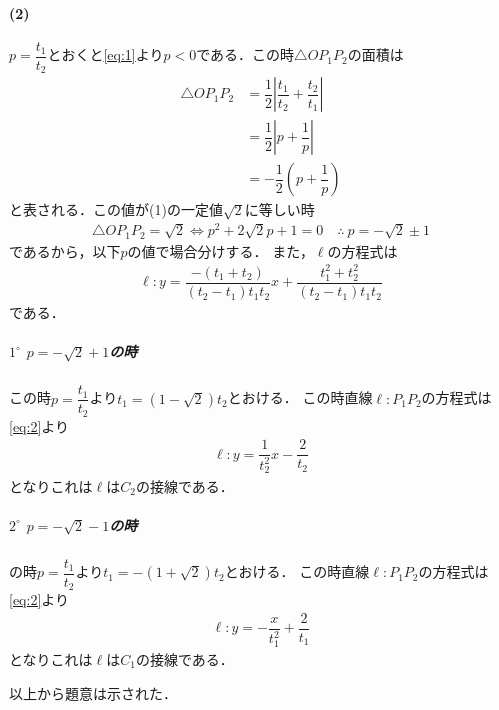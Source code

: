 \documentclass[../../main.tex]{subfiles}
\begin{document}
\paragraph{(2)}
$p=\dfrac{t_1}{t_2}$とおくと\cref{eq:1}より$p<0$である．この時$\triangle OP_1P_2$の面積は
\begin{align}
  \triangle OP_1P_2
  &=\dfrac{1}{2}\left|\dfrac{t_1}{t_2}+\dfrac{t_2}{t_1}\right| \\
  &=\dfrac{1}{2}\left|p+\dfrac{1}{p}\right| \\
  &=-\dfrac{1}{2}\left(p+\dfrac{1}{p}\right)
\end{align}
と表される．この値が(1)の一定値$\sqrt{2}$に等しい時
\begin{align}
  \triangle OP_1P_2=\sqrt{2} \iff p^2+2\sqrt{2}p+1=0 \quad\therefore\ p=-\sqrt{2}\pm1
\end{align}
であるから，以下$p$の値で場合分けする．
また，$\ell$の方程式は
\begin{align}
  \ell: y = \dfrac{-(t_1+t_2)}{(t_2-t_1)t_1t_2}x + \dfrac{t_1^2+t_2^2}{(t_2-t_1)t_1t_2} \label{eq:2}
\end{align}
である．

\subparagraph{$1^\circ$ $p=-\sqrt{2}+1$の時}

この時$p=\dfrac{t_1}{t_2}$より$t_1=(1-\sqrt{2})t_2$とおける．
この時直線$\ell: P_1P_2$の方程式は\cref{eq:2}より
\begin{align}
  \ell: y=\dfrac{1}{t_2^2}x-\dfrac{2}{t_2}
\end{align}
となりこれは$\ell$は$C_2$の接線である．

\subparagraph{$2^\circ$ $p=-\sqrt{2}-1$の時}

の時$p=\dfrac{t_1}{t_2}$より$t_1=-(1+\sqrt{2})t_2$とおける．
この時直線$\ell: P_1P_2$の方程式は\cref{eq:2}より
\begin{align}
  \ell: y=-\dfrac{x}{t_1^2}+\dfrac{2}{t_1}
\end{align}
となりこれは$\ell$は$C_1$の接線である．
\casesend

以上から題意は示された．

\newpage
\end{document}
